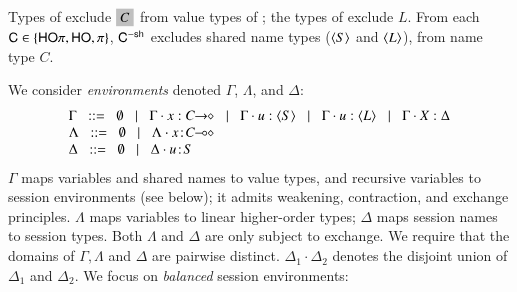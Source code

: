 \documentclass[runningheads]{llncs}
\begin{document}
Types of \HO exclude $\nonhosyntax{C}$ from 
value types of \HOp; the types of \sessp exclude $L$. 
From each $\mathsf{C} \in \{\mathsf{HO}\pi, \mathsf{HO}, \pi \}$, $\mathsf{C}^{-\mathsf{sh}}$ 
excludes shared name types ($\langle S \rangle$ and $\langle L \rangle$), 
from name type $C$.



We consider \emph{environments} denoted $\Gamma$, $\Lambda$, and $\Delta$:
\[
	\begin{array}{l}
		\Gamma  \bnfis  \emptyset \bnfbar \Gamma \cat \varp{x}: \shot{C} \bnfbar \Gamma \cat u: \chtype{S} \bnfbar \Gamma \cat u: \chtype{L} 
		\bnfbar \Gamma \cat \rvar{X}: \Delta
\\
		\Lambda \bnfis  \emptyset \bnfbar \Lambda \cat \AT{x}{\lhot{C}}
		 \\
		\Delta   \bnfis   \emptyset \bnfbar \Delta \cat \AT{u}{S}
	\end{array}
\]
$\Gamma$ maps variables and shared names to value types, and recursive 
variables to session environments (see below);  
it admits weakening, contraction, and exchange principles.
$\Lambda$ maps variables to 
linear
higher-order
types;   $\Delta$  maps   
session names to session types. 
Both $\Lambda$ and $\Delta$
are
only subject to exchange.  
We require that the domains of $\Gamma,
\Lambda$ and $\Delta$ are pairwise distinct. 
$\Delta_1\cdot \Delta_2$ denotes the disjoint union of $\Delta_1$ and $\Delta_2$.  
We focus on \emph{balanced} session environments: 
\end{document}
